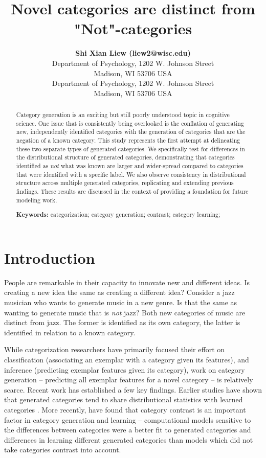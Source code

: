 \documentclass[10pt,letterpaper]{article}
\title{Novel categories are distinct from "Not"-categories}
\author{{\large \bf Shi Xian Liew (liew2@wisc.edu)} \\
  Department of Psychology, 1202 W. Johnson Street \\
  Madison, WI 53706 USA
  \AND {\large \bf Joseph L. Austerweil (austerweil@wisc.edu)} \\
  Department of Psychology, 1202 W. Johnson Street \\
  Madison, WI 53706 USA}
\begin{document}
\maketitle


\begin{abstract}

Category generation is an exciting but still poorly understood topic in cognitive science. One issue that is consistently being overlooked is the conflation of generating new, independently identified categories with the generation of categories that are the negation of a known category. This study represents the first attempt at delineating these two separate types of generated categories. We specifically test for differences in the distributional structure of generated categories, demonstrating that categories identified as \emph{not} what was known are larger and wider-spread compared to categories that were identified with a specific label. We also observe consistency in distributional structure across multiple generated categories, replicating and extending previous findings. These results are discussed in the context of providing a foundation for future modeling work.

\textbf{Keywords:} 
categorization; category generation; contrast; category learning; 
\end{abstract}


\section{Introduction}
People are remarkable in their capacity to innovate new and different ideas. Is creating a new idea the same as creating a different idea? Consider a jazz musician who wants to generate music in a new genre. Is that the same as wanting to generate music that is {\em not} jazz? Both new categories of music are distinct from jazz. The former is identified as its own category,   the latter is identified in relation to a known category.

While categorization researchers have primarily focused their effort on classification (associating an exemplar with a category given its features), and inference (predicting exemplar features given its category),
work on category generation -- predicting all exemplar features for a novel
category -- is relatively scarce. Recent work has established a few key
findings. Earlier studies have shown that generated
categories tend to share distributional statistics with learned categories \cite{jern2013probabilistic,thomas98,ward1994structured}. More recently, 
 have found that category contrast is an important
factor in category generation and learning -- computational models sensitive to the
differences between categories were a better fit to generated categories and differences in learning different generated categories than models
which did not take categories contrast into account.
\end{document}
